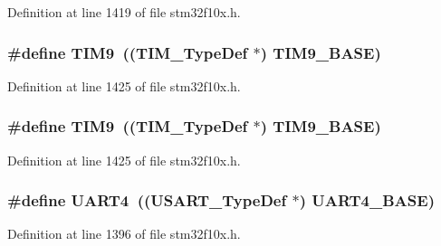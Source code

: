 Definition at line 1419 of file stm32f10x.\+h.

\subsubsection[{\texorpdfstring{T\+I\+M9}{TIM9}}]{\setlength{\rightskip}{0pt plus 5cm}\#define T\+I\+M9~(({\bf T\+I\+M\+\_\+\+Type\+Def} $\ast$) {\bf T\+I\+M9\+\_\+\+B\+A\+SE})}\hypertarget{group___peripheral__declaration_gaf52b4b4c36110a0addfa98059f54a50e}{}\label{group___peripheral__declaration_gaf52b4b4c36110a0addfa98059f54a50e}


Definition at line 1425 of file stm32f10x.\+h.

\subsubsection[{\texorpdfstring{T\+I\+M9}{TIM9}}]{\setlength{\rightskip}{0pt plus 5cm}\#define T\+I\+M9~(({\bf T\+I\+M\+\_\+\+Type\+Def} $\ast$) {\bf T\+I\+M9\+\_\+\+B\+A\+SE})}\hypertarget{group___peripheral__declaration_gaf52b4b4c36110a0addfa98059f54a50e}{}\label{group___peripheral__declaration_gaf52b4b4c36110a0addfa98059f54a50e}


Definition at line 1425 of file stm32f10x.\+h.

\subsubsection[{\texorpdfstring{U\+A\+R\+T4}{UART4}}]{\setlength{\rightskip}{0pt plus 5cm}\#define U\+A\+R\+T4~(({\bf U\+S\+A\+R\+T\+\_\+\+Type\+Def} $\ast$) {\bf U\+A\+R\+T4\+\_\+\+B\+A\+SE})}\hypertarget{group___peripheral__declaration_ga7c035f6f443c999fc043b2b7fb598800}{}\label{group___peripheral__declaration_ga7c035f6f443c999fc043b2b7fb598800}


Definition at line 1396 of file stm32f10x.\+h.

